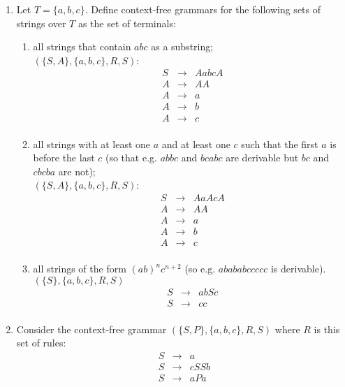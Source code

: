 \documentclass[12pt]{article}
\begin{document}
\begin{enumerate}
\item Let $T=\{a,b,c\}$. Define context-free grammars for the following sets of strings over $T$ as the set of terminals:
  \begin{enumerate}
  \item all strings that contain $abc$ as a substring; \\
    $(\{S,A\},\{a,b,c\},R,S)$:
    \[
      \begin{array}{lll}
        S & \rightarrow & AabcA \\
        A & \rightarrow & AA \\
        A & \rightarrow & a \\
        A & \rightarrow & b \\
        A & \rightarrow & c \\
      \end{array}
    \]
  \item all strings with at least one $a$ and at least one $c$ such that the first $a$ is before the last $c$ (so that e.g. $abbc$ and $bcabc$ are derivable but $bc$ and $cbcba$ are not); \\
    $(\{S,A\},\{a,b,c\},R,S)$:
    \[
      \begin{array}{lll}
        S & \rightarrow & AaAcA \\
        A & \rightarrow & AA \\
        A & \rightarrow & a \\
        A & \rightarrow & b \\
        A & \rightarrow & c \\
      \end{array}
    \]
  \item all strings of the form $(ab)^nc^{n+2}$ (so e.g. $abababccccc$ is derivable). \\
    $(\{S\},\{a,b,c\},R,S)$
    \[
      \begin{array}{lll}
        S & \rightarrow & abSc \\
        S & \rightarrow & cc \\
      \end{array}
    \]
  \end{enumerate}
\item Consider the context-free grammar $(\{S,P\},\{a,b,c\},R,S)$ where $R$ is this set of rules:
    \[
      \begin{array}{lll}
        S & \rightarrow & a \\
        S & \rightarrow & cSSb \\
        S & \rightarrow & aPa \\

\end{array}\]
\end{enumerate}
\end{document}
